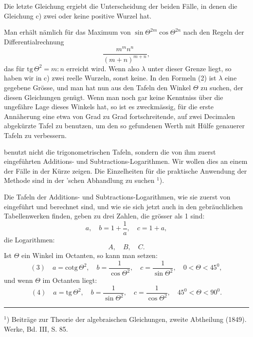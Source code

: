 
Die letzte Gleichung ergiebt die Unterscheidung der beiden Fälle, in denen die Gleichung c) zwei oder keine positive Wurzel hat.

Man erhält nämlich für das Maximum von $\sin\Theta^{2m}\cos\Theta^{2n}$ nach den Regeln der Differentialrechnung
\[
\frac{m^m n^n}{(m+n)^{m+n}},
\]
das für $\mathrm{tg}\,\Theta^2 = m:n$ erreicht wird. Wenn also $\lambda$ unter dieser Grenze liegt, so haben wir in c) zwei reelle Wurzeln, sonst keine. In den Formeln (2) ist $\lambda$ eine gegebene Grösse, und man hat nun aus den Tafeln den Winkel $\Theta$ zu suchen, der diesen Gleichungen genügt. Wenn man noch gar keine Kenntniss über die ungefähre Lage dieses Winkels hat, so ist es zweckmässig, für die erste Annäherung eine etwa von Grad zu Grad fortschreitende, auf zwei Decimalen abgekürzte Tafel zu benutzen, um den so gefundenen Werth mit Hülfe genauerer Tafeln zu verbessern.

 benutzt nicht die trigonometrischen Tafeln, sondern die von ihm zuerst eingeführten Additions- und Subtractions-Logarithmen. Wir wollen dies an einem der Fälle in der Kürze zeigen. Die Einzelheiten für die praktische Anwendung der Methode sind in der 'schen Abhandlung zu suchen $^1$).

Die Tafeln der Additions- und Subtractions-Logarithmen, wie sie zuerst von  eingeführt und berechnet sind, und wie sie sich jetzt auch in den gebräuchlichen Tabellenwerken finden, geben zu drei Zahlen, die grösser als 1 sind:
\[
a, \quad b = 1+\frac{1}{a}, \quad c = 1+a,
\]
die  Logarithmen:
\[
A, \quad B, \quad C.
\]
Ist $\Theta$ ein Winkel im  Octanten, so kann man setzen:
\[
(3)\quad a = \mathrm{cotg}\,\Theta^2, \quad b = \frac{1}{\cos\Theta^2}, \quad c = \frac{1}{\sin\Theta^2}, \quad 0 < \Theta < 45^0,
\]
und wenn $\Theta$ im  Octanten liegt:
\[
(4)\quad a = \mathrm{tg}\,\Theta^2, \quad b = \frac{1}{\sin\Theta^2}, \quad c = \frac{1}{\cos\Theta^2}, \quad 45^0 < \Theta < 90^0.
\]

\noindent\rule{4cm}{0.4pt}

$^1$) Beiträge zur Theorie der algebraischen Gleichungen, zweite Abtheilung (1849).  Werke, Bd. III, S. 85.
